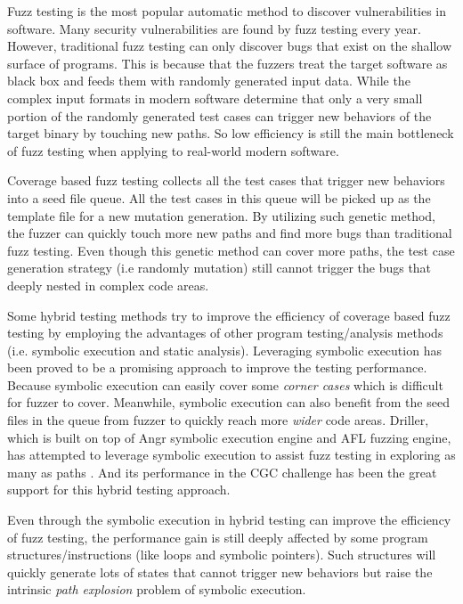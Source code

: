 Fuzz testing is the most popular automatic method to discover vulnerabilities in software. Many security vulnerabilities are found by fuzz testing every year. However, traditional fuzz testing can only discover bugs that exist on the shallow surface of programs. This is because that the fuzzers treat the target software as black box and feeds them with randomly generated input data. While the complex input formats in modern software determine that only a very small portion of the randomly generated test cases can trigger new behaviors of the target binary by touching new paths. So low efficiency is still the main bottleneck of fuzz testing when applying to real-world modern software. 

Coverage based fuzz testing collects all the test cases that trigger new behaviors into a seed file queue. All the test cases in this queue will be picked up as the template file for a new mutation generation. By utilizing such genetic method, the fuzzer can quickly touch more new paths and find more bugs than traditional fuzz testing. Even though this genetic method can cover more paths, the test case generation strategy (i.e randomly mutation) still cannot trigger the bugs that deeply nested in complex code areas.  


Some hybrid testing methods try to improve the efficiency of coverage based fuzz testing by employing the advantages of other program testing/analysis methods (i.e. symbolic execution and static analysis). 
Leveraging symbolic execution has been proved to be a promising approach to improve the testing performance. Because symbolic execution can easily cover some \textit{corner cases} which is difficult for fuzzer to cover. Meanwhile, symbolic execution can also benefit from the seed files in the queue from fuzzer to quickly reach more \textit{wider} code areas. Driller, which is built on top of Angr symbolic execution engine and AFL fuzzing engine, has attempted to leverage symbolic execution to assist fuzz testing in exploring as many as paths \cite{stephens2016driller}. And its performance in the CGC challenge \cite{online:CGC} has been the great support for this hybrid testing approach.

Even through the symbolic execution in hybrid testing can improve the efficiency of fuzz testing, the performance gain is still deeply affected by some program structures/instructions (like loops and symbolic pointers). Such structures will quickly generate lots of states that cannot trigger new behaviors but raise the intrinsic \textit{path explosion} problem of symbolic execution. 

